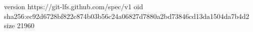 version https://git-lfs.github.com/spec/v1
oid sha256:ec92d6728bf822c874b03b56c24a06827d7880a2bd73846cd13da1504da7b4d2
size 21960
